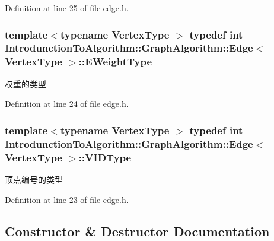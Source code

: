 Definition at line 25 of file edge.\+h.

\hypertarget{class_introdunction_to_algorithm_1_1_graph_algorithm_1_1_edge_a34045c46a299bb27dab97ba7e3c554c3}{}
\subsubsection[{E\+Weight\+Type}]{\setlength{\rightskip}{0pt plus 5cm}template$<$typename Vertex\+Type $>$ typedef int {\bf Introdunction\+To\+Algorithm\+::\+Graph\+Algorithm\+::\+Edge}$<$ Vertex\+Type $>$\+::{\bf E\+Weight\+Type}}\label{class_introdunction_to_algorithm_1_1_graph_algorithm_1_1_edge_a34045c46a299bb27dab97ba7e3c554c3}
权重的类型 

Definition at line 24 of file edge.\+h.

\hypertarget{class_introdunction_to_algorithm_1_1_graph_algorithm_1_1_edge_afe54a3bbe1f907ed578054641bf8ea07}{}
\subsubsection[{V\+I\+D\+Type}]{\setlength{\rightskip}{0pt plus 5cm}template$<$typename Vertex\+Type $>$ typedef int {\bf Introdunction\+To\+Algorithm\+::\+Graph\+Algorithm\+::\+Edge}$<$ Vertex\+Type $>$\+::{\bf V\+I\+D\+Type}}\label{class_introdunction_to_algorithm_1_1_graph_algorithm_1_1_edge_afe54a3bbe1f907ed578054641bf8ea07}
顶点编号的类型 

Definition at line 23 of file edge.\+h.



\subsection{Constructor \& Destructor Documentation}
\hypertarget{class_introdunction_to_algorithm_1_1_graph_algorithm_1_1_edge_a0b1204366a8df8fa4de12bb233bd8e94}{}
